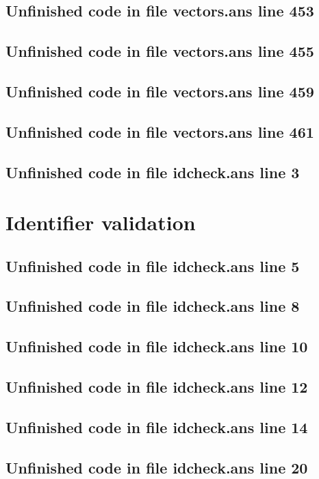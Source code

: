 \documentclass[twoside,9pt]{report}
\begin{document}
\section{Unfinished code in file vectors.ans line 453}
\section{Unfinished code in file vectors.ans line 455}
\section{Unfinished code in file vectors.ans line 459}
\section{Unfinished code in file vectors.ans line 461}
\section{Unfinished code in file idcheck.ans line 3}
\chapter{Identifier validation}
\label{identifier-validation}
\section{Unfinished code in file idcheck.ans line 5}

\section{Unfinished code in file idcheck.ans line 8}
\section{Unfinished code in file idcheck.ans line 10}
\section{Unfinished code in file idcheck.ans line 12}
\section{Unfinished code in file idcheck.ans line 14}
\section{Unfinished code in file idcheck.ans line 20}
\end{document}
